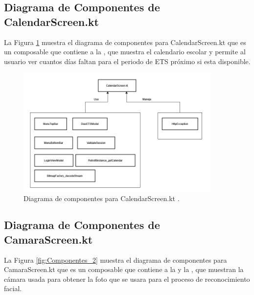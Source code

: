\newpage

\subsection{Diagrama de Componentes de CalendarScreen.kt}

La Figura \ref{fig:Componentes_1} muestra el diagrama de componentes para CalendarScreen.kt que es un composable que contiene a la , que muestra el calendario escolar y permite al usuario ver cuantos días faltan para el periodo de ETS próximo si esta disponible.

\begin{figure}[htbp!]
	\begin{center}
		\includegraphics[width=0.9\textwidth]{DiagramasMoviles/DCM (13)}
		\caption{Diagrama de componentes para CalendarScreen.kt .}
		\label{fig:Componentes_1}
	\end{center}
\end{figure}

\newpage

\subsection{Diagrama de Componentes de CamaraScreen.kt}

La Figura \ref{fig:Componentes_2} muestra el diagrama de componentes para CamaraScreen.kt que es un composable que contiene a la  y la , que muestran la cámara usada para obtener la foto que se usara para el proceso de reconocimiento facial.

